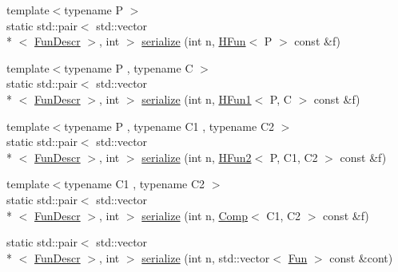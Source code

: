 \begin{DoxyCompactItemize}
\item 
{\footnotesize template$<$typename P $>$ }\\static std\-::pair$<$ std\-::vector\\*
$<$ \hyperlink{structpfq__lang_1_1FunDescr}{Fun\-Descr} $>$, int $>$ \hyperlink{namespacepfq__lang_1_1term_a5cb0871466843f156dd63407d108cf64}{serialize} (int n, \hyperlink{structpfq__lang_1_1term_1_1HFun}{H\-Fun}$<$ P $>$ const \&f)
\item 
{\footnotesize template$<$typename P , typename C $>$ }\\static std\-::pair$<$ std\-::vector\\*
$<$ \hyperlink{structpfq__lang_1_1FunDescr}{Fun\-Descr} $>$, int $>$ \hyperlink{namespacepfq__lang_1_1term_a6738402db5e4f8c9537909a736d4b5d9}{serialize} (int n, \hyperlink{structpfq__lang_1_1term_1_1HFun1}{H\-Fun1}$<$ P, C $>$ const \&f)
\item 
{\footnotesize template$<$typename P , typename C1 , typename C2 $>$ }\\static std\-::pair$<$ std\-::vector\\*
$<$ \hyperlink{structpfq__lang_1_1FunDescr}{Fun\-Descr} $>$, int $>$ \hyperlink{namespacepfq__lang_1_1term_a3eae5fc2875893f0101923fdb8102fe0}{serialize} (int n, \hyperlink{structpfq__lang_1_1term_1_1HFun2}{H\-Fun2}$<$ P, C1, C2 $>$ const \&f)
\item 
{\footnotesize template$<$typename C1 , typename C2 $>$ }\\static std\-::pair$<$ std\-::vector\\*
$<$ \hyperlink{structpfq__lang_1_1FunDescr}{Fun\-Descr} $>$, int $>$ \hyperlink{namespacepfq__lang_1_1term_af01be80516d757eac5c404e90afee1ce}{serialize} (int n, \hyperlink{structpfq__lang_1_1term_1_1Comp}{Comp}$<$ C1, C2 $>$ const \&f)
\item 
static std\-::pair$<$ std\-::vector\\*
$<$ \hyperlink{structpfq__lang_1_1FunDescr}{Fun\-Descr} $>$, int $>$ \hyperlink{namespacepfq__lang_1_1term_a0da0d1c391bc1f06bece1df9e025ee0e}{serialize} (int n, std\-::vector$<$ \hyperlink{structpfq__lang_1_1term_1_1Fun}{Fun} $>$ const \&cont)
\end{DoxyCompactItemize}


